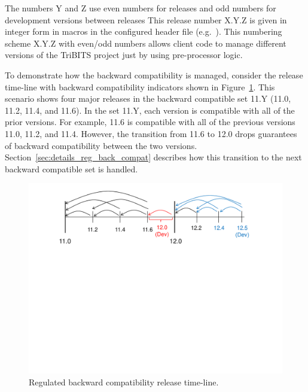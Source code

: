 \documentclass[11pt]{SANDreport}
\begin{document}
The numbers Y and Z use even numbers for releases and odd numbers for
development versions between releases
This release number X.Y.Z is given in integer form in macros in the
configured header file {} (e.g.\
{}).  This numbering scheme X.Y.Z with
even/odd numbers allows client code to manage different versions of
the TriBITS project just by using pre-processor logic.

To demonstrate how the backward compatibility is managed, consider the
release time-line with backward compatibility indicators shown in
Figure~\ref{fig:BackwardCompatibilityTimeline}.  This scenario shows
four major releases in the backward compatible set 11.Y (11.0, 11.2,
11.4, and 11.6).  In the set 11.Y, each version is compatible with all
of the prior versions.  For example, 11.6 is compatible with all of
the previous versions 11.0, 11.2, and 11.4.  However, the transition
from 11.6 to 12.0 drops guarantees of backward compatibility between
the two versions.  Section~\ref{sec:details_reg_back_compat} describes
how this transition to the next backward compatible set is handled.

\begin{figure}
\begin{center}
\includegraphics[trim = 1.0in 5.0in 1.0in 0.2in, scale=0.55]
{BackwardCompatibilityTimeline}
{}\caption{Regulated backward compatibility release time-line.}
\label{fig:BackwardCompatibilityTimeline}
\end{center}
\end{figure}
\end{document}
